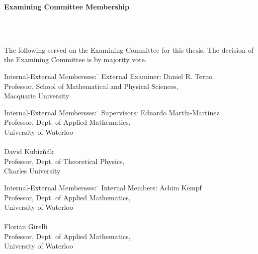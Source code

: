 \cleardoublepage %

\begin{center}\textbf{Examining Committee Membership}\end{center}
  \noindent

\vspace{-3cm}
\textcolor{white}{I wrote this PhD thesis in 6 weeks. I deeply regret starting so late, but I ended up being fairly proud of it :)}
\vspace{2cm}

The following served on the Examining Committee for this thesis. The decision of the Examining Committee is by majority vote.
  \bigskip
  
  \noindent
\begin{tabbing}
Internal-External Memberssss: \=  \kill %
External Examiner: \>  Daniel R. Terno \\ 
\> Professor, School of Mathematical and Physical Sciences,\\ \> Macquarie University \\
\end{tabbing} 
  \bigskip
  \noindent
\begin{tabbing}
Internal-External Memberssss:  \=  \kill %
Supervisors: \>Eduardo Martín-Martínez \\
\> Professor, Dept. of Applied Mathematics,\\ \>University of Waterloo \\
\\
\> David Kubiz\v nák \\
\> Professor, Dept. of Theoretical Physics,\\ \>Charles University \\
\end{tabbing}
  \bigskip
  
  \noindent
  \begin{tabbing}
Internal-External Memberssss: \=  \kill %
Internal Members: \> Achim Kempf \\
\> Professor, Dept. of Applied Mathematics,\\ \>University of Waterloo \\
\\
\> Florian Girelli \\
\> Professor, Dept. of Applied Mathematics,\\ \>University of Waterloo \\
\end{tabbing}
  \bigskip
  \bigskip
  
